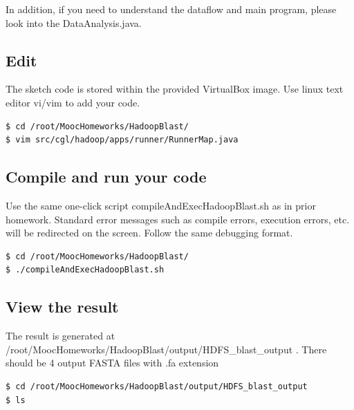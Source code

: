In addition, if you need to understand the dataflow and main program, please
look into the DataAnalysis.java.




\subsection*{Edit}
The sketch code is stored within the provided VirtualBox image. Use linux text
editor vi/vim to add your code.

\begin{lstlisting}[language=bash]
$ cd /root/MoocHomeworks/HadoopBlast/
$ vim src/cgl/hadoop/apps/runner/RunnerMap.java
\end{lstlisting}

\subsection*{Compile and run your code}
Use the same one-click script compileAndExecHadoopBlast.sh as in prior
homework. Standard error messages such as compile errors, execution errors,
etc. will be redirected on the screen. Follow the same debugging format.

\begin{lstlisting}[language=bash]
$ cd /root/MoocHomeworks/HadoopBlast/
$ ./compileAndExecHadoopBlast.sh 
\end{lstlisting}

\subsection*{View the result} 
The result is generated at
/root/MoocHomeworks/HadoopBlast/output/HDFS\_blast\_output . There should be 4
output FASTA files with .fa extension

\begin{lstlisting}[language=bash]
$ cd /root/MoocHomeworks/HadoopBlast/output/HDFS_blast_output
$ ls
\end{lstlisting}
